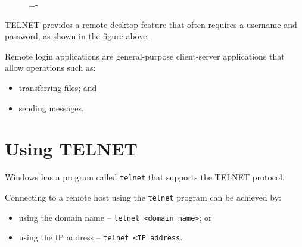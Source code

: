 \documentclass[a4paper]{systems-software}
\begin{document}
\begin{figure}[H]
	\lineskip=-\fboxrule
\end{figure}

TELNET provides a remote desktop feature that often requires a username and password, as shown in the figure above.

Remote login applications are general-purpose client-server applications that allow operations such as:
\begin{itemize}
	\item transferring files; and
	\item sending messages.
\end{itemize}


\section*{Using TELNET}

Windows has a program called \texttt{telnet} that supports the TELNET protocol.

Connecting to a remote host using the \texttt{telnet} program can be achieved by:
\begin{itemize}
	\item using the domain name -- \texttt{telnet <domain name>}; or
	\item using the IP address -- \texttt{telnet <IP address}.
\end{itemize}
\end{document}
